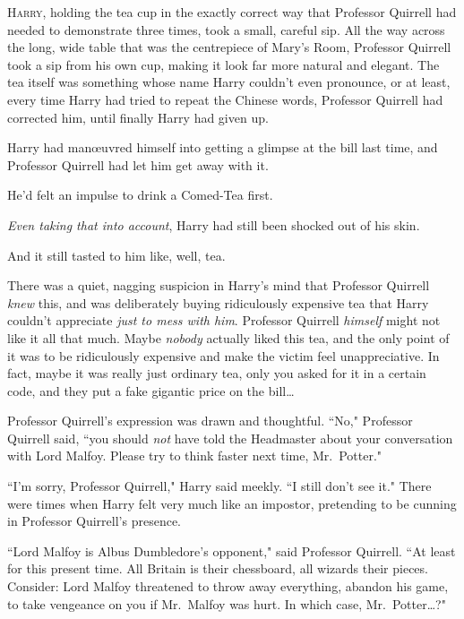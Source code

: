 
\lettrine{H}{arry}, holding the tea cup in the exactly correct way that Professor Quirrell had needed to demonstrate three times, took a small, careful sip. All the way across the long, wide table that was the centrepiece of Mary's Room, Professor Quirrell took a sip from his own cup, making it look far more natural and elegant. The tea itself was something whose name Harry couldn't even pronounce, or at least, every time Harry had tried to repeat the Chinese words, Professor Quirrell had corrected him, until finally Harry had given up.

Harry had manœuvred himself into getting a glimpse at the bill last time, and Professor Quirrell had let him get away with it.

He'd felt an impulse to drink a Comed-Tea first.

\emph{Even taking that into account}, Harry had still been shocked out of his skin.

And it still tasted to him like, well, tea.

There was a quiet, nagging suspicion in Harry's mind that Professor Quirrell \emph{knew} this, and was deliberately buying ridiculously expensive tea that Harry couldn't appreciate \emph{just to mess with him}. Professor Quirrell \emph{himself} might not like it all that much. Maybe \emph{nobody} actually liked this tea, and the only point of it was to be ridiculously expensive and make the victim feel unappreciative. In fact, maybe it was really just ordinary tea, only you asked for it in a certain code, and they put a fake gigantic price on the bill{\ldots}

Professor Quirrell's expression was drawn and thoughtful. ``No," Professor Quirrell said, ``you should \emph{not} have told the Headmaster about your conversation with Lord Malfoy. Please try to think faster next time, Mr.~Potter."

``I'm sorry, Professor Quirrell," Harry said meekly. ``I still don't see it." There were times when Harry felt very much like an impostor, pretending to be cunning in Professor Quirrell's presence.

``Lord Malfoy is Albus Dumbledore's opponent," said Professor Quirrell. ``At least for this present time. All Britain is their chessboard, all wizards their pieces. Consider: Lord Malfoy threatened to throw away everything, abandon his game, to take vengeance on you if Mr.~Malfoy was hurt. In which case, Mr.~Potter{\ldots}?"

